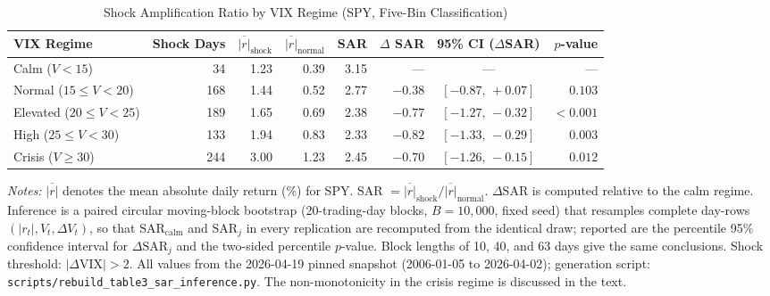 \documentclass[12pt,a4paper]{article}
\begin{document}
\begin{table}[H]
\centering
\caption{Shock Amplification Ratio by VIX Regime (SPY, Five-Bin Classification)}
\label{tab:absorption_core}
\begin{threeparttable}
\begin{tabular}{lrrrrrcr}
\toprule
VIX Regime & Shock Days & $\overline{|r|}_{\text{shock}}$ & $\overline{|r|}_{\text{normal}}$ & SAR & $\Delta$ SAR & 95\% CI ($\Delta$SAR) & $p$-value \\
\midrule
Calm ($V < 15$)              & 34  & 1.23 & 0.39 & 3.15 & ---     & --- & ---       \\
Normal ($15 \leq V < 20$)    & 168 & 1.44 & 0.52 & 2.77 & $-0.38$ & $[-0.87,\,+0.07]$ & $0.103$ \\
Elevated ($20 \leq V < 25$)  & 189 & 1.65 & 0.69 & 2.38 & $-0.77$ & $[-1.27,\,-0.32]$ & $< 0.001$ \\
High ($25 \leq V < 30$)      & 133 & 1.94 & 0.83 & 2.33 & $-0.82$ & $[-1.33,\,-0.29]$ & $0.003$ \\
Crisis ($V \geq 30$)         & 244 & 3.00 & 1.23 & 2.45 & $-0.70$ & $[-1.26,\,-0.15]$ & $0.012$ \\
\bottomrule
\end{tabular}
\begin{tablenotes}
\small
\item \textit{Notes:} $\overline{|r|}$ denotes the mean absolute daily return (\%) for SPY. SAR $= \overline{|r|}_{\text{shock}} / \overline{|r|}_{\text{normal}}$. $\Delta$SAR is computed relative to the calm regime. Inference is a paired circular moving-block bootstrap (20-trading-day blocks, $B = 10{,}000$, fixed seed) that resamples complete day-rows $(|r_t|, V_t, \Delta V_t)$, so that $\text{SAR}_{\text{calm}}$ and $\text{SAR}_j$ in every replication are recomputed from the identical draw; reported are the percentile 95\% confidence interval for $\Delta\text{SAR}_j$ and the two-sided percentile $p$-value. Block lengths of 10, 40, and 63 days give the same conclusions. Shock threshold: $|\Delta\text{VIX}| > 2$. All values from the 2026-04-19 pinned snapshot (2006-01-05 to 2026-04-02); generation script: \texttt{scripts/rebuild\_table3\_sar\_inference.py}. The non-monotonicity in the crisis regime is discussed in the text.
\end{tablenotes}
\end{threeparttable}
\end{table}
\end{document}
